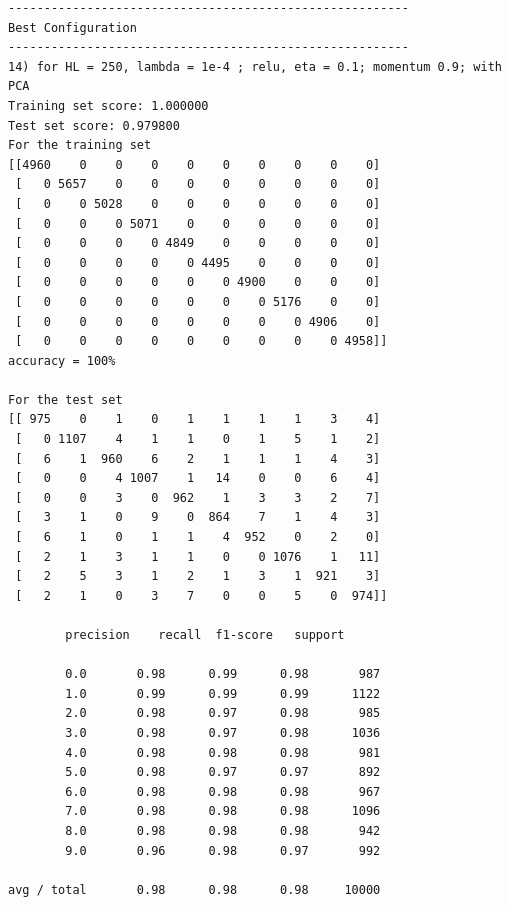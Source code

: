 \documentclass[conference]{IEEEtran}
\begin{document}
 \newpage
 \begin{verbatim}
--------------------------------------------------------
Best Configuration
--------------------------------------------------------
14) for HL = 250, lambda = 1e-4 ; relu, eta = 0.1; momentum 0.9; with PCA
Training set score: 1.000000
Test set score: 0.979800
For the training set
[[4960    0    0    0    0    0    0    0    0    0]
 [   0 5657    0    0    0    0    0    0    0    0]
 [   0    0 5028    0    0    0    0    0    0    0]
 [   0    0    0 5071    0    0    0    0    0    0]
 [   0    0    0    0 4849    0    0    0    0    0]
 [   0    0    0    0    0 4495    0    0    0    0]
 [   0    0    0    0    0    0 4900    0    0    0]
 [   0    0    0    0    0    0    0 5176    0    0]
 [   0    0    0    0    0    0    0    0 4906    0]
 [   0    0    0    0    0    0    0    0    0 4958]]
accuracy = 100%

For the test set
[[ 975    0    1    0    1    1    1    1    3    4]
 [   0 1107    4    1    1    0    1    5    1    2]
 [   6    1  960    6    2    1    1    1    4    3]
 [   0    0    4 1007    1   14    0    0    6    4]
 [   0    0    3    0  962    1    3    3    2    7]
 [   3    1    0    9    0  864    7    1    4    3]
 [   6    1    0    1    1    4  952    0    2    0]
 [   2    1    3    1    1    0    0 1076    1   11]
 [   2    5    3    1    2    1    3    1  921    3]
 [   2    1    0    3    7    0    0    5    0  974]]
 
        precision    recall  f1-score   support

        0.0       0.98      0.99      0.98       987
        1.0       0.99      0.99      0.99      1122
        2.0       0.98      0.97      0.98       985
        3.0       0.98      0.97      0.98      1036
        4.0       0.98      0.98      0.98       981
        5.0       0.98      0.97      0.97       892
        6.0       0.98      0.98      0.98       967
        7.0       0.98      0.98      0.98      1096
        8.0       0.98      0.98      0.98       942
        9.0       0.96      0.98      0.97       992

avg / total       0.98      0.98      0.98     10000

\end{verbatim}
 \newpage
\end{document}
